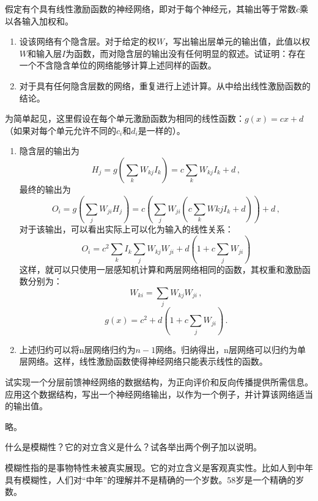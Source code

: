 \begin{question}
假定有个具有线性激励函数的神经网络，即对于每个神经元，其输出等于常数$c$乘以各输入加权和。
	\begin{enumerate}
		\item 设该网络有个隐含层。对于给定的权$W$，写出输出层单元的输出值，此值以权$W$和输入层$I$为函数，而对隐含层的输出没有任何明显的叙述。试证明：存在一个不含隐含单位的网络能够计算上述同样的函数。
		\item 对于具有任何隐含层数的网络，重复进行上述计算。从中给出线性激励函数的结论。
	\end{enumerate}
\end{question}
\begin{solution}
为简单起见，这里假设在每个单元激励函数为相同的线性函数：$g(x)=cx+d$（如果对每个单元允许不同的$c_i$和$d_i$是一样的）。
	\begin{enumerate}
	\item 隐含层的输出为
	\[ H_j = g \left( \sum\limits_k W_{kj} I_k \right) = c \sum\limits_k W_{kj} I_k + d \, ,\]
	最终的输出为
	\[ O_i = g \left( \sum\limits_j W_{ji} H_j \right) = c \left( \sum\limits_j W_{ji} \left( c \sum\limits_k W{kj} I_k + d \right) \right) + d \, ,\]
	对于该输出，可以看出实际上可以化为输入的线性关系：
	\[ O_i = c^2 \sum\limits_k I_k \sum\limits_j W_{kj} W_{ji} + d \left( 1 + c \sum\limits_j W_{ji} \right)\]
	这样，就可以只使用一层感知机计算和两层网络相同的函数，其权重和激励函数分别为：
	\[ W_{ki} = \sum\limits_j W_{kj} W_{ji} \, ,\]
	\[ g(x) = c^2 + d \left( 1+c \sum\limits_j W_{ji} \right) \, .\]
	\item 上述归约可以将n层网络归约为$n-1$网络。归纳得出，n层网络可以归约为单层网络。这样，线性激励函数使得神经网络只能表示线性的函数。
	\end{enumerate}
\end{solution}

\begin{question}
试实现一个分层前馈神经网络的数据结构，为正向评价和反向传播提供所需信息。应用这个数据结构，写出一个神经网络输出，以作为一个例子，并计算该网络适当的输出值。
\end{question}
\begin{solution}
略。
\end{solution}

\begin{question}
什么是模糊性？它的对立含义是什么？试各举出两个例子加以说明。
\end{question}
\begin{solution}
模糊性指的是事物特性未被真实展现。它的对立含义是客观真实性。比如人到中年具有模糊性，人们对``中年''的理解并不是精确的一个岁数。58岁是一个精确的岁数。
\end{solution}

